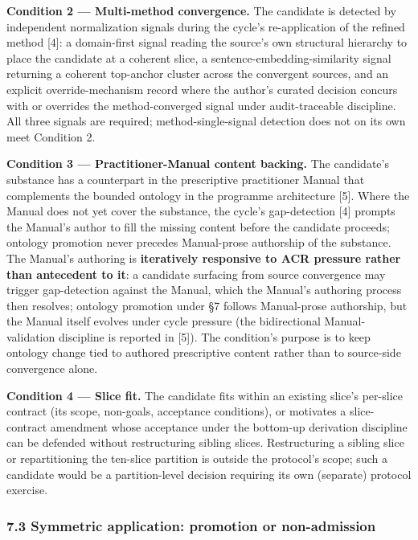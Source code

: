\documentclass[
]{article}
\begin{document}
\textbf{Condition 2 --- Multi-method convergence.} The candidate is
detected by independent normalization signals during the cycle's
re-application of the refined method {[}4{]}: a domain-first signal
reading the source's own structural hierarchy to place the candidate at
a coherent slice, a sentence-embedding-similarity signal returning a
coherent top-anchor cluster across the convergent sources, and an
explicit override-mechanism record where the author's curated decision
concurs with or overrides the method-converged signal under
audit-traceable discipline. All three signals are required;
method-single-signal detection does not on its own meet Condition 2.

\textbf{Condition 3 --- Practitioner-Manual content backing.} The
candidate's substance has a counterpart in the prescriptive practitioner
Manual that complements the bounded ontology in the programme
architecture {[}5{]}. Where the Manual does not yet cover the substance,
the cycle's gap-detection {[}4{]} prompts the Manual's author to fill
the missing content before the candidate proceeds; ontology promotion
never precedes Manual-prose authorship of the substance. The Manual's
authoring is \textbf{iteratively responsive to ACR pressure rather than
antecedent to it}: a candidate surfacing from source convergence may
trigger gap-detection against the Manual, which the Manual's authoring
process then resolves; ontology promotion under §7 follows Manual-prose
authorship, but the Manual itself evolves under cycle pressure (the
bidirectional Manual-validation discipline is reported in {[}5{]}). The
condition's purpose is to keep ontology change tied to authored
prescriptive content rather than to source-side convergence alone.

\textbf{Condition 4 --- Slice fit.} The candidate fits within an
existing slice's per-slice contract (its scope, non-goals, acceptance
conditions), or motivates a slice-contract amendment whose acceptance
under the bottom-up derivation discipline can be defended without
restructuring sibling slices. Restructuring a sibling slice or
repartitioning the ten-slice partition is outside the protocol's scope;
such a candidate would be a partition-level decision requiring its own
(separate) protocol exercise.

\subsubsection{7.3 Symmetric application: promotion or
non-admission}\label{symmetric-application-promotion-or-non-admission}
\end{document}
